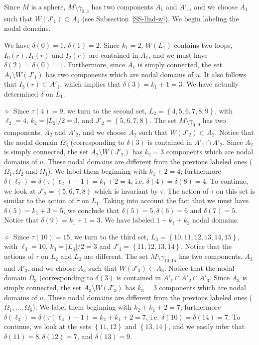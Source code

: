 \documentclass[12pt,a4paper]{amsart}
\theoremstyle{plain} %
\theoremstyle{definition}
\numberwithin{equation}{section}
\numberwithin{figure}{section}
\numberwithin{table}{section}
\newcommand{\sm}{\!\setminus\!}
\newcommand{\set}[1]{\left\lbrace #1 \right\rbrace}
\newcommand{\noid}{\noindent $\diamond$~}
\begin{document}
Since $M$ is a sphere, $M\sm \gamma_{0,3}$ has two components $A_1$ and $A'_1$, and we choose $A_1$ such that $W(J'_1) \subset A_1$ (see Subsection~\ref{SS-llnd-w}). We begin labeling the nodal domains.\smallskip

We have $\delta(0) = 1$, $\delta(1) = 2$. Since $k_1 = 2$, $W(L_1)$ contains two loops, $I_0(r), I_1(r)$ and $I_2(r)$ are contained in $A_1$, and we must have $\delta(2)= \delta(0)=1$. Furthermore, since $A_1$ is simply connected, the set $A_1\sm W(J'_1)$ has two components which are nodal domains of $u$. It also follows that $I_3(r) \subset A'_1$, which implies that $\delta(3) = k_1+1=3$. We have actually determined $\delta$ on $L_1$. \smallskip

\noid Since $\tau(4) = 9$, we turn to the second set,  $L_2 = \set{4,5,6,7,8,9}$, with $\ell_2 = 4$, $k_2 = |L_2|/2 = 3$, and $J'_2 = \set{5,6,7,8}$. The set $M\sm \gamma_{4,9}$ has two components, $A_2$ and $A'_2$, and we choose $A_2$ such that $W(J'_2) \subset A_2$. Notice that the nodal domain $\Omega_3$ (corresponding to $\delta(3)$ is contained in $A'_1 \cap A'_2$. Since $A_2$ is simply connected, the set $A_2 \sm W(J'_2)$ has $k_2=3$ components which are nodal domains of $u$. These nodal domains are different from the previous labeled ones ($\Omega_1, \Omega_2$ and $\Omega_3$). We label them beginning with $k_1+2=4$; furthermore $\delta(\ell_2) = \delta(\tau(\ell_2)-1) = k_1+2 = 4$, i.e. $\delta(4) = \delta(8) = 4$. To continue, we look at $J'_2 = \set{5,6,7,8}$ which is invariant by $\tau$. The action of $\tau$ on this set is similar to the action of $\tau$ on $L_1$. Taking into account the fact that we must have $\delta(5) = k_1+ 3 = 5$, we conclude that $\delta(5) = 5, \delta(6) = 6$ and $\delta(7) = 5$. Notice that $\delta(9) = k_1+1 = 3$. We have labeled $1+k_1+k_2$ nodal domains. \smallskip

\noid Since $\tau(10) = 15$, we turn to the third set,  $L_3 = \set{10,11,12,13,14,15}$, with $\ell_3 = 10$, $k_3 = |L_3|/2 = 3$ and $J'_3 = \set{11,12,13,14}$. Notice that the actions of $\tau$ on $L_2$ and $L_3$ are different. The set $M\sm \gamma_{10,15}$ has two components, $A_3$ and $A'_3$, and we choose $A_3$ such that $W(J'_3) \subset A_3$. Notice that the nodal domain $\Omega_3$ (corresponding to $\delta(3)$ is contained in $A'_1 \cap A'_2 \cap A'_3$. Since $A_3$ is simply connected, the set $A_3 \sm W(J'_3)$ has $k_3=3$ components which are nodal domains of $u$. These nodal domains are different from the previous labeled ones ($\Omega_1, \ldots, \Omega_6$). We label them beginning with $k_2+k_1+2=7$; furthermore $\delta(\ell_3) = \delta(\tau(\ell_3)-1) = k_2+k_1+2 = 7$, i.e. $\delta(10) = \delta(14) = 7$. To continue, we look at the sets $\set{11,12}$ and $\set{13,14}$, and we easily infer that $\delta(11) = 8, \delta(12) = 7$, and $\delta(13)=9$.\smallskip
\end{document}

